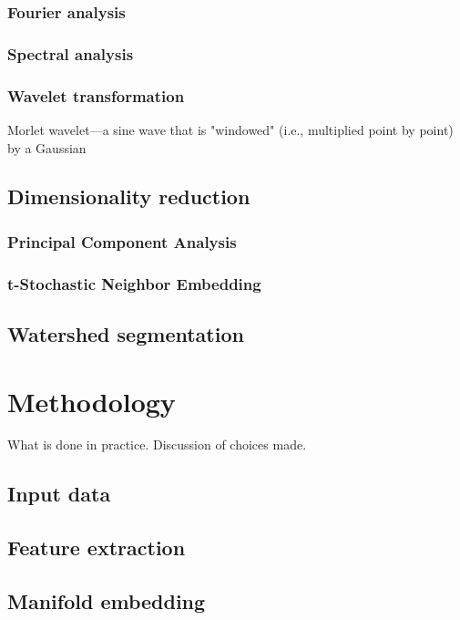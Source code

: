 \documentclass{article}
\theoremstyle{plain}
\theoremstyle{definition}
\theoremstyle{remark}
\begin{document}
\subsubsection{Fourier analysis}
\subsubsection{Spectral analysis}
\subsubsection{Wavelet transformation}
Morlet wavelet—a sine wave that is "windowed" (i.e., multiplied point by point) by a Gaussian


\subsection{Dimensionality reduction}
\subsubsection{Principal Component Analysis}
\subsubsection{t-Stochastic Neighbor Embedding}

\subsection{Watershed segmentation}

\section{Methodology}
What is done in practice.
Discussion  of choices made.
\subsection{Input data}
\subsection{Feature extraction}
\subsection{Manifold embedding}








\newpage
\printbibliography
\end{document}
